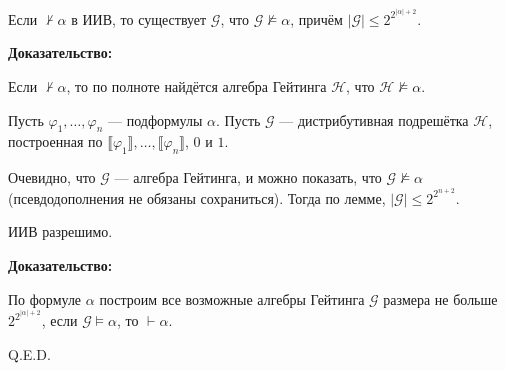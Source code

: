 
Если $\not\vdash \alpha$ в ИИВ, то существует $\mathcal{G}$,
что $\mathcal{G} \not\models \alpha$, причём $|\mathcal{G}| \le 2^{2^{|\alpha|+2}}$.

\textbf{Доказательство:}

Если $\not\vdash \alpha$, то по 
полноте найдётся алгебра Гейтинга $\mathcal{H}$, что
$\mathcal{H} \not\models \alpha$. 

Пусть $\varphi_1, \dots, \varphi_n$ --- подформулы $\alpha$.
Пусть $\mathcal{G}$ --- дистрибутивная подрешётка $\mathcal{H}$, 
построенная по $\llbracket \varphi_1 \rrbracket, \dots, \llbracket \varphi_n \rrbracket$, $0$ и $1$. 

Очевидно, что $\mathcal{G}$ --- алгебра Гейтинга, и можно показать, 
что $\mathcal{G} \not\models \alpha$ (псевдодополнения не обязаны сохраниться).
Тогда по лемме, $|\mathcal{G}| \le 2^{2^{n+2}}$. 



ИИВ разрешимо.

\textbf{Доказательство:}

По формуле $\alpha$ построим все возможные алгебры Гейтинга $\mathcal{G}$ размера не больше $2^{2^{|\alpha|+2}}$,
если $\mathcal{G}\models\alpha$, то $\vdash\alpha$.

\hfill Q.E.D.


